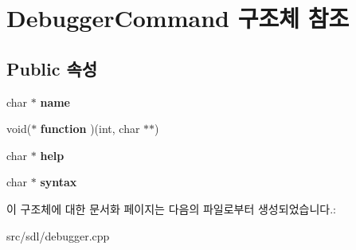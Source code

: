 \hypertarget{struct_debugger_command}{}\section{Debugger\+Command 구조체 참조}
\label{struct_debugger_command}
\subsection*{Public 속성}
\begin{DoxyCompactItemize}
\item 
\mbox{\label{struct_debugger_command_a14e015150e5517ddf66877dff61190df}} 
char $\ast$ {\bfseries name}
\item 
\mbox{\label{struct_debugger_command_a7dc1272eddb6304a1266dff8b4d99d18}} 
void($\ast$ {\bfseries function} )(int, char $\ast$$\ast$)
\item 
\mbox{\label{struct_debugger_command_a23a8468dffa8e08b122db31ac3c11a4c}} 
char $\ast$ {\bfseries help}
\item 
\mbox{\label{struct_debugger_command_aa127ebfc49b0d9b0837c4fd2329e0110}} 
char $\ast$ {\bfseries syntax}
\end{DoxyCompactItemize}


이 구조체에 대한 문서화 페이지는 다음의 파일로부터 생성되었습니다.\+:\begin{DoxyCompactItemize}
\item 
src/sdl/debugger.\+cpp\end{DoxyCompactItemize}
